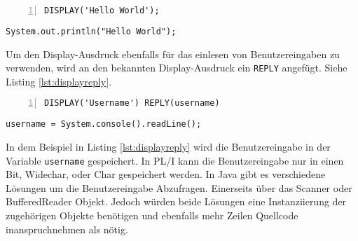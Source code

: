 \begin{minipage}[b]{0.5\linewidth}
	\centering
	\lstset{language=PL/I,label=SliceExaple}
	\begin{lstlisting}[frame=single, numbers=left, mathescape,%
		caption={Transformation deiner If-Else-Statements}, label={lst:display}]
		DISPLAY('Hello World');
	\end{lstlisting}
\end{minipage}
\hspace{0.5cm}
\begin{minipage}[b]{0.5\linewidth}
	\centering
	\lstset{language=Java,label=SliceExaple}
	\begin{lstlisting}[frame=single, mathescape,%
		title={}]
		System.out.println("Hello World");
	\end{lstlisting}
\end{minipage} 


Um den Display-Ausdruck ebenfalls für das einlesen von Benutzereingaben zu verwenden, wird an den bekannten Display-Ausdruck ein \verb+REPLY+ angefügt. Siehe Listing \ref{lst:displayreply}.

\begin{minipage}[b]{0.5\linewidth}
	\centering
	\lstset{language=PL/I,label=SliceExaple}
	\begin{lstlisting}[frame=single, numbers=left, mathescape,%
		caption={Transformation deiner If-Else-Statements}, label={lst:displayreply}]
		DISPLAY('Username') REPLY(username)
	\end{lstlisting}
\end{minipage}
\hspace{0.5cm}
\begin{minipage}[b]{0.5\linewidth}
	\centering
	\lstset{language=Java,label=SliceExaple}
	\begin{lstlisting}[frame=single, mathescape,%
		title={}]
		username = System.console().readLine(); 
	\end{lstlisting}
\end{minipage} 

In dem Beispiel in Listing \ref{lst:displayreply} wird die Benutzereingabe in der
Variable \verb+username+ gespeichert.
In PL/I kann die Benutzereingabe nur in einen Bit, Widechar, oder Char gespeichert
werden. 
In Java gibt es verschiedene Lösungen um die Benutzereingabe Abzufragen.
Einerseits über das Scanner oder BufferedReader Objekt.
Jedoch würden beide Lösungen eine Instanziierung der zugehörigen Objekte benötigen und ebenfalls mehr Zeilen Quellcode inanspruchnehmen als nötig.

